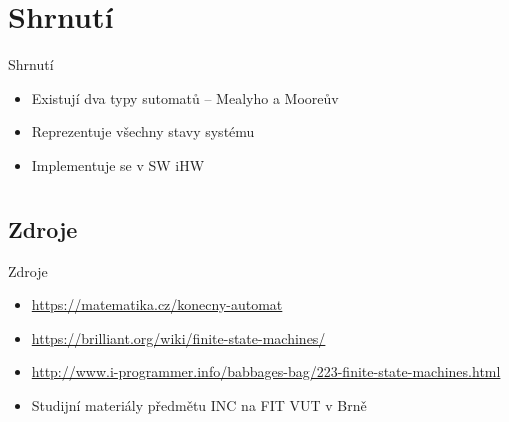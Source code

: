 \documentclass{beamer}
\begin{document}
\section{Shrnutí}

\begin{frame}{Shrnutí}
  \begin{itemize}
  \item
    Existují dva typy sutomatů -- Mealyho a Mooreův
  \item
    Reprezentuje všechny stavy systému
  \item
    Implementuje se v SW iHW
  \end{itemize}
  

\end{frame}
\appendix
\section*{\appendixname}
\subsection*{Zdroje}

\begin{frame}{Zdroje}
  \begin{itemize}
      \item \url{https://matematika.cz/konecny-automat}
      \item \url{https://brilliant.org/wiki/finite-state-machines/}
      \item \url{http://www.i-programmer.info/babbages-bag/223-finite-state-machines.html}
      \item Studijní materiály předmětu INC na FIT VUT v Brně
  \end{itemize}
    
\end{frame}
\end{document}
